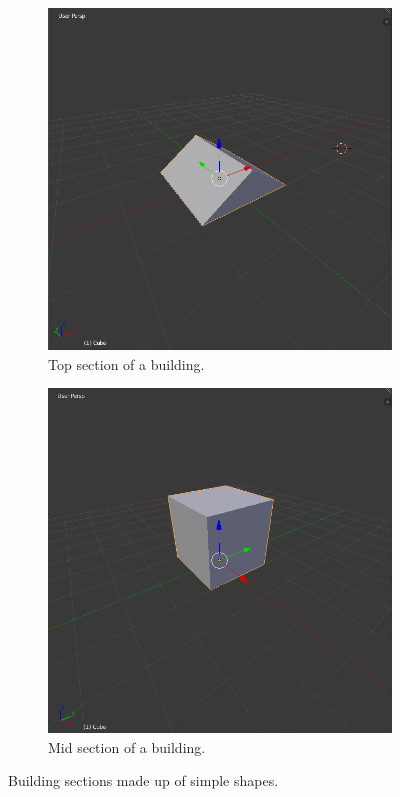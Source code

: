 \begin{figure}[h]
	\centering
	\begin{subfigure}{0.35\textwidth}
		\centering
		\includegraphics[width=0.9\linewidth]{"Images/roof"}
		\caption{Top section of a building.}
		\label{fig:roof-mesh}
	\end{subfigure}
	\begin{subfigure}{0.35\textwidth}
		\centering
		\includegraphics[width=0.9\linewidth]{"Images/cube"}
		\caption{Mid section of a building.}
		\label{fig:cube-mesh}
	\end{subfigure}
	\caption{Building sections made up of simple shapes.}
	\label{fig:simple-sections}
\end{figure}

